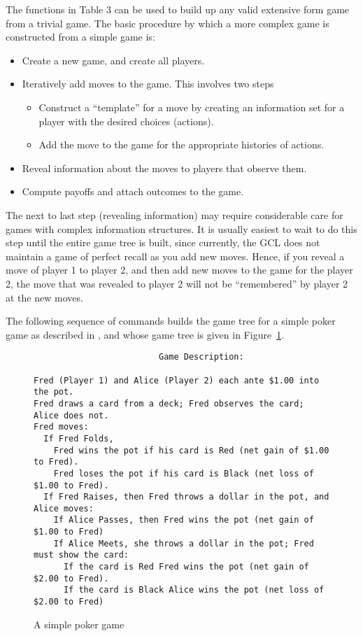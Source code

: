 The functions in Table 3 can be used to build up any valid extensive
form game from a trivial game.  The basic procedure by which a more
complex game is constructed from a simple game is:

\begin{itemize}
\item
Create a new game, and create all players.  
\item
Iteratively add moves to the game.  This involves two steps
\begin{itemize}
\item
Construct a ``template'' for a move by creating an information set for
a player with the desired choices (actions).  

\item
Add the move to the game for the appropriate histories of actions.  
\end{itemize}
\item
Reveal information about the moves to players that observe them.  

\item
Compute payoffs and attach outcomes to the game.  
\end{itemize}

The next to last step (revealing information) may require considerable
care for games with complex information structures.  It is usually
easiest to wait to do this step until the entire game tree is built,
since currently, the GCL does not maintain a game of perfect recall as
you add new moves.  Hence, if you reveal a move of player 1 to player
2, and then add new moves to the game for the player 2, the move that
was revealed to player 2 will not be ``remembered'' by player 2 at the
new moves.

The following sequence of commands builds the game tree for a simple
poker game as described in \cite{Mye:91}, and whose game tree is given
in Figure~\ref{fig:poker}.  

\begin{figure}[htp]
\label{fig:poker}
\vspace{.25in}
\begin{verbatim} 
                         Game Description:

Fred (Player 1) and Alice (Player 2) each ante $1.00 into the pot.
Fred draws a card from a deck; Fred observes the card; Alice does not. 
Fred moves:
  If Fred Folds, 
    Fred wins the pot if his card is Red (net gain of $1.00 to Fred).
    Fred loses the pot if his card is Black (net loss of $1.00 to Fred).
  If Fred Raises, then Fred throws a dollar in the pot, and Alice moves:
    If Alice Passes, then Fred wins the pot (net gain of $1.00 to Fred)
    If Alice Meets, she throws a dollar in the pot; Fred must show the card: 
      If the card is Red Fred wins the pot (net gain of $2.00 to Fred).
      If the card is Black Alice wins the pot (net loss of $2.00 to Fred)
\end{verbatim}
\caption{A simple poker game}
\end{figure}
\medskip

